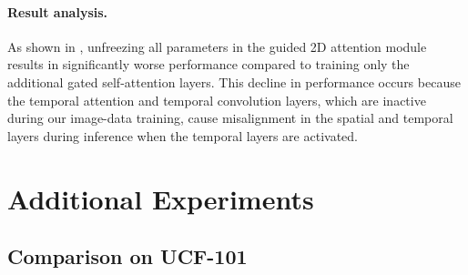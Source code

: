 \begin{table}[h]
\begin{center}
\end{center}
\caption{
Comparison of only updating parameters in gated self-attention (GatedSA) between updating all parameters in guided 2D attention (Entire Guided 2D Attn) of our \method{} on MSR-VTT. 
}
\label{table:ablation_trainable_parameters}
\end{table}





\paragraph{Result analysis.} As shown in , unfreezing all parameters in the guided 2D attention module results in significantly worse performance compared to training only the additional gated self-attention layers. This decline in performance occurs because the temporal attention and temporal convolution layers, which are inactive during our image-data training, cause misalignment in the spatial and temporal layers during inference when the temporal layers are activated.




\section{Additional Experiments}
\label{appendix:additional_experiments}

\subsection{Comparison on UCF-101}




